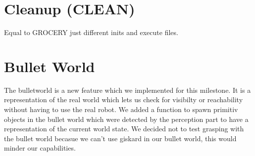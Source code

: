 \documentclass[main.tex]{subfiles}
\begin{document}
                \section{Cleanup (CLEAN)}
                Equal to GROCERY just different inits and execute files.
                \section{Bullet World}
                The bulletworld is a new feature which we implemented for this milestone. It is a representation of the real world which lets us check for visibilty or reachability without having to use the real robot. We added a function to spawn primitiv objects in the bullet world which were detected by the perception part to have a representation of the current world state. We decided not to test grasping with the bullet world becasue we can't use giskard in our bullet world, this would minder our capabilities. 
                
\end{document}
